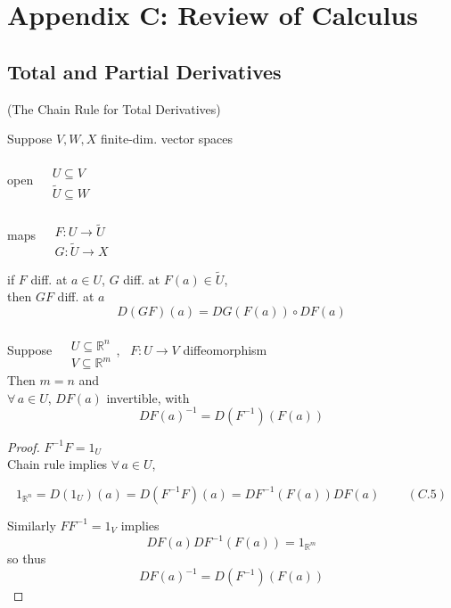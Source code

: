 \section{Appendix C: Review of Calculus}

\subsection*{Total and Partial Derivatives}

\begin{proposition}[C.3] (The Chain Rule for Total Derivatives)

Suppose $V,W,X$ finite-dim. vector spaces

open $\begin{aligned}
  & \quad \\ 
  & U \subseteq V \\
  & \widetilde{U} \subseteq W \end{aligned}$

maps $\begin{aligned}
  & \quad \\
  & F : U \to \widetilde{U} \\
  & G: \widetilde{U} \to X \end{aligned}$

if $F$ diff. at $a\in U$, $G$ diff. at $F(a) \in \widetilde{U}$, \\
\phantom{ \quad } then $GF$ diff. at $a$
\[
D(GF)(a) = DG(F(a)) \circ DF(a)
\]
\end{proposition}

\begin{proposition}[C.4] Suppose $\begin{aligned}
    & \quad \\ 
    & U \subseteq \mathbb{R}^n \\
    & V\subseteq \mathbb{R}^m \end{aligned}$, \quad \, $F: U \to V$ diffeomorphism \\
Then $m=n$ and \\
\phantom{ \quad } $\forall \, a \in U$, $DF(a)$ invertible, with 
\[
DF(a)^{-1} = D(F^{-1})(F(a))
\]
\end{proposition}

\begin{proof}
$F^{-1}F = 1_U$  \\
Chain rule implies $\forall \, a \in U$, 

\begin{equation}
  1_{\mathbb{R}^n} = D(1_U)(a) = D(F^{-1}F)(a) = DF^{-1}(F(a))DF(a) \quad \quad \, (C.5)
\end{equation}

Similarly $FF^{-1}=1_V$ implies
\[
DF(a)DF^{-1}(F(a)) = 1_{\mathbb{R}^m}
\]
so thus
\[
DF(a)^{-1}=D(F^{-1})(F(a))
\]
\end{proof}
